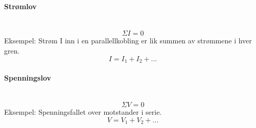 \paragraph{Strømlov} \hfill \\
$$\Sigma I = 0$$
Eksempel:
Strøm I inn i en parallellkobling er lik summen av strømmene i hver gren.
$$I = I_1 + I_2 + ...$$



\paragraph{Spenningslov} \hfill \\
$$\Sigma V = 0$$
Eksempel:
Spenningsfallet over motstander i serie.
$$V = V_1 + V_2 + ...$$
